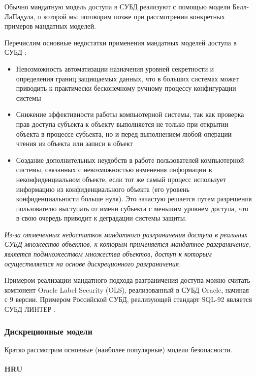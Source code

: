 Обычно мандатную модель доступа в СУБД реализуют с помощью модели Белл-ЛаПадула, о которой мы поговорим позже 
при рассмотрении конкретных примеров мандатных моделей.

Перечислим основные недостатки применения мандатных моделей доступа в СУБД \autocite{Skakun}:
\begin{itemize}
    \item Невозможность автоматизации назначения уровней секретности и определения границ защищаемых данных, 
    что в больших системах может приводить к практически бесконечному ручному процессу конфигурации системы
    \item Снижение эффективности работы компьютерной системы, так как проверка прав доступа субъекта к объекту 
    выполняется не только при открытии объекта в процессе субъекта, но и перед выполнением любой операции 
    чтения из объекта или записи в объект
    \item Создание дополнительных неудобств в работе пользователей компьютерной системы, связанных с 
    невозможностью изменения информации в неконфиденциальном объекте, если тот же самый процесс использует 
    информацию из конфиденциального объекта (его уровень конфиденциальности больше нуля). Это зачастую
    решается путем разрешения пользователю выступать от имени субъекта с меньшим уровнем доступа, что в 
    свою очередь приводит к деградации системы защиты.
\end{itemize}

\textit{Из-за отмеченных недостатков мандатного разграничения доступа в реальных СУБД множество объектов, к которым 
применяется мандатное разграничение, является подмножеством множества объектов, доступ к которым осуществляется 
на основе дискреционного разграничения.}

Примером реализации мандатного подхода разграничения доступа можно считать компонент Oracle Label Security (OLS), 
реализованный в СУБД Oracle, начиная с 9 версии. Примером Российской СУБД, реализующей стандарт SQL-92 является 
СУБД ЛИНТЕР \autocite{Skakun}.

\subsubsection{Дискреционные модели}

Кратко рассмотрим основные (наиболее популярные) модели безопасности.

\paragraph{HRU}

